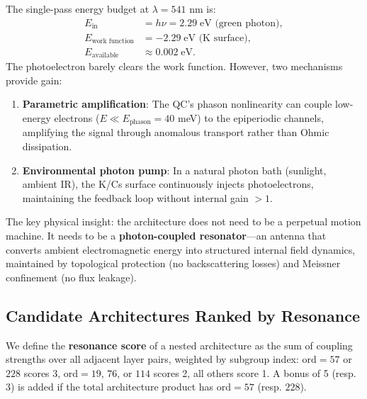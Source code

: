 \noindent The single-pass energy budget at $\lambda = 541$ nm is:
\begin{align}
    E_{\text{in}} &= h\nu = 2.29 \;\text{eV (green photon)}, \\
    E_{\text{work function}} &= -2.29 \;\text{eV (K surface)}, \\
    E_{\text{available}} &\approx 0.002 \;\text{eV}.
\end{align}
The photoelectron barely clears the work function. However, two mechanisms provide gain:
\begin{enumerate}
    \item \textbf{Parametric amplification}: The QC's phason nonlinearity can couple low-energy electrons ($E \ll E_{\text{phason}} = 40$ meV) to the epiperiodic channels, amplifying the signal through anomalous transport rather than Ohmic dissipation.
    \item \textbf{Environmental photon pump}: In a natural photon bath (sunlight, ambient IR), the K/Cs surface continuously injects photoelectrons, maintaining the feedback loop without internal gain $> 1$.
\end{enumerate}

\noindent The key physical insight: the architecture does not need to be a perpetual motion machine. It needs to be a \textbf{photon-coupled resonator}---an antenna that converts ambient electromagnetic energy into structured internal field dynamics, maintained by topological protection (no backscattering losses) and Meissner confinement (no flux leakage).

\subsection{Candidate Architectures Ranked by Resonance}

We define the \textbf{resonance score} of a nested architecture as the sum of coupling strengths over all adjacent layer pairs, weighted by subgroup index: $\mathrm{ord} = 57$ or $228$ scores 3, $\mathrm{ord} = 19$, $76$, or $114$ scores 2, all others score 1. A bonus of 5 (resp. 3) is added if the total architecture product has $\mathrm{ord} = 57$ (resp. $228$).

